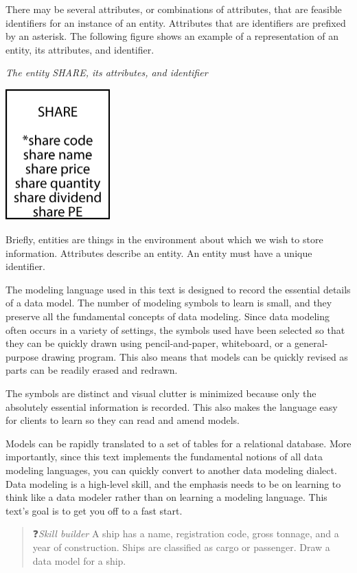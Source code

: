 \documentclass[
]{article}
\begin{document}
There may be several attributes, or combinations of attributes, that are feasible identifiers for an instance of an entity. Attributes that are identifiers are prefixed by an asterisk. The following figure shows an example of a representation of an entity, its attributes, and identifier.

\emph{The entity SHARE, its attributes, and identifier}

\includegraphics[width=1.58333in,height=\textheight]{Figures/Chapter 3/share with identifier.png}

Briefly, entities are things in the environment about which we wish to store information. Attributes describe an entity. An entity must have a unique identifier.

The modeling language used in this text is designed to record the essential details of a data model. The number of modeling symbols to learn is small, and they preserve all the fundamental concepts of data modeling. Since data modeling often occurs in a variety of settings, the symbols used have been selected so that they can be quickly drawn using pencil-and-paper, whiteboard, or a general-purpose drawing program. This also means that models can be quickly revised as parts can be readily erased and redrawn.

The symbols are distinct and visual clutter is minimized because only the absolutely essential information is recorded. This also makes the language easy for clients to learn so they can read and amend models.

Models can be rapidly translated to a set of tables for a relational database. More importantly, since this text implements the fundamental notions of all data modeling languages, you can quickly convert to another data modeling dialect. Data modeling is a high-level skill, and the emphasis needs to be on learning to think like a data modeler rather than on learning a modeling language. This text's goal is to get you off to a fast start.

\begin{quote}
❓\emph{Skill builder} A ship has a name, registration code, gross tonnage, and a year of construction. Ships are classified as cargo or passenger. Draw a data model for a ship.
\end{quote}
\end{document}
